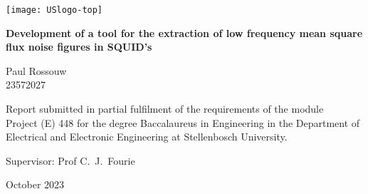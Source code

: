 \graphicspath{{frontmatter/fig/}}

\begin{titlepage}
	\begin{center}
		
		\texttt{[image: USlogo-top]}
		
		\vfill
		
		{\sffamily \bfseries \huge Development of a tool for the extraction of low frequency mean square flux noise figures in SQUID's \par}
		
		\vfill
		
		{\large {\Large Paul Rossouw} \\ 23572027 \par}
		
		\vfill
		
		\vfill
		
		{Report submitted in partial fulfilment of the requirements of the module \\
			Project (E) 448 for the degree Baccalaureus in Engineering in the Department of
			Electrical and Electronic Engineering at Stellenbosch University. \par}
		
		\vfill
		
		{\large {Supervisor}: Prof C.\ J.\ Fourie} %
		
		\vfill
		
		{\Large October 2023}
	\end{center}
\end{titlepage}

